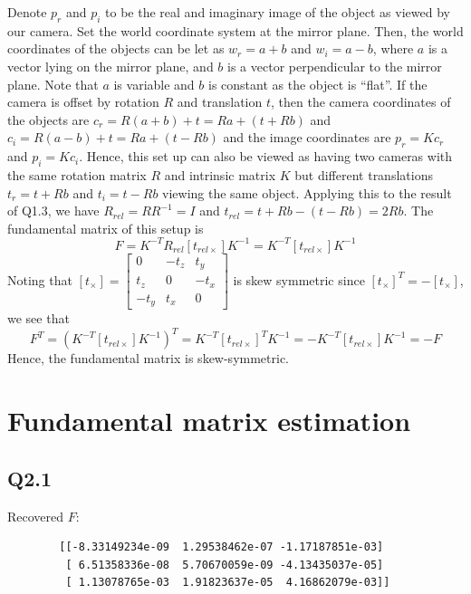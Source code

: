 \documentclass{article} %
\begin{document}
    Denote $p_{r}$ and $p_{i}$ to be the real and imaginary image of the object as viewed by our camera. Set the world coordinate system at the mirror plane. Then, the world coordinates of the objects can be let as $w_{r}=a+b$ and $w_{i}=a-b$, where $a$ is a vector lying on the mirror plane, and $b$ is a vector perpendicular to the mirror plane. Note that $a$ is variable and $b$ is constant as the object is ``flat''. If the camera is offset by rotation $R$ and translation $t$, then the camera coordinates of the objects are $c_{r}=R\left(a+b\right)+t=Ra+(t+Rb)$ and $c_{i}=R\left(a-b\right)+t=Ra+(t-Rb)$ and the image coordinates are $p_{r}=Kc_{r}$ and $p_{i}=Kc_{i}$. Hence, this set up can also be viewed as having two cameras with the same rotation matrix $R$ and intrinsic matrix $K$ but different translations $t_{r}=t+Rb$ and $t_{i}=t-Rb$ viewing the same object. Applying this to the result of Q1.3, we have $R_{rel}=RR^{-1}=I$ and $t_{rel}=t+Rb-\left(t-Rb\right)=2Rb$. The fundamental matrix of this setup is
    \begin{equation*}
    F=K^{-T}R_{rel}\left[t_{rel\times }\right]K^{-1}=K^{-T}\left[t_{rel\times }\right]K^{-1}
    \end{equation*}
    Noting that $\left[t_{\times }\right]=\left[\begin{array}{ccc}
    0 & -t_{z} & t_{y}\\
    t_{z} & 0 & -t_{x}\\
    -t_{y} & t_{x} & 0
    \end{array}\right]$ is skew symmetric since $\left[t_{\times }\right]^{T}=-\left[t_{\times }\right]$, we see that 
    \begin{equation*}
    F^{T}=\left(K^{-T}\left[t_{rel\times }\right]K^{-1}\right)^{T}=K^{-T}\left[t_{rel\times }\right]^{T}K^{-1}=-K^{-T}\left[t_{rel\times }\right]K^{-1}=-F
    \end{equation*}
    Hence, the fundamental matrix is skew-symmetric.

    \section{Fundamental matrix estimation}
    \subsection*{Q2.1}
    Recovered $F$:
    \begin{verbatim}
        [[-8.33149234e-09  1.29538462e-07 -1.17187851e-03]
         [ 6.51358336e-08  5.70670059e-09 -4.13435037e-05]
         [ 1.13078765e-03  1.91823637e-05  4.16862079e-03]]
    \end{verbatim}
\end{document}
